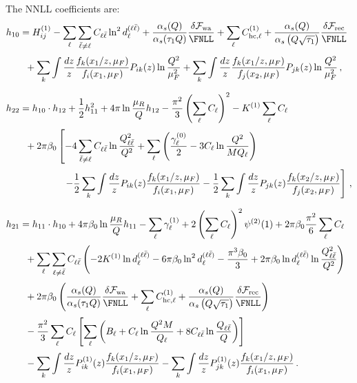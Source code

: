 The NNLL coefficients are:
\begin{subequations}
\begin{align}
&h_{10}= H_{ij}^{(1)}-\sum_{\ell}\sum_{\bar\ell\neq\ell} C_{\ell\bar\ell}\ln^2 d_\ell^{(\ell\bar\ell)}+\frac{\alpha_s(Q)}{\alpha_s(\tau_1 Q)}\frac{\delta\mathcal{F}_{\rm wa}}{\FNLL}+ \sum_{\ell}C_{\mathrm{hc},\ell}^{(1)}+\frac{\alpha_s(Q)}{\alpha_s\left(Q\sqrt{\tau_1}\right)}\frac{\delta\mathcal{F}_{\rm rec}}{\FNLL}\notag\\[0.5ex]
&\qquad +\sum_{k}\int\frac{dz}{z}\frac{f_k(x_1/z,\mu_F)}{f_i(x_1,\mu_F)} P_{ik}(z)\ln\frac{Q^2}{\mu_F^2}
+\sum_{k}\int\frac{dz}{z}\frac{f_k(x_1/z,\mu_F)}{f_j(x_2,\mu_F)} P_{jk}(z)\ln\frac{Q^2}{\mu_F^2}\,,\\[1.5ex]
\label{eq:h22}
&h_{22}=h_{10}\cdot h_{12}+\frac{1}{2}h_{11}^2+4\pi\ln\frac{\mu_R}{Q}h_{12}-\frac{\pi^2}{3}\left(\sum_{\ell}C_{\ell}\right)^2 -K^{(1)}\sum_{\ell}C_{\ell} \notag\\[0.5ex]
&\qquad+2\pi\beta_0\left[-4\sum_{\bar\ell\neq\ell}C_{\ell\bar\ell}\ln\frac{Q_{\ell\bar\ell}^2}{Q^2}
+\sum_{\ell}\left(\frac{\gamma_\ell^{(0)}}{2}-3C_\ell \ln\frac{Q^2}{M Q_{\ell}}\right)\right. \notag \\[0.5ex]
&\qquad\qquad\qquad\left. -\frac{1}{2}\sum_{k}\int\frac{dz}{z}P_{ik}(z)\frac{f_k(x_1/z,\mu_F)}{f_i(x_1,\mu_F)}-\frac{1}{2}\sum_{k}\int\frac{dz}{z}P_{jk}(z)\frac{f_k(x_2/z,\mu_F)}{f_j(x_2,\mu_F)}\right]\,,\\[1.5ex]
\label{eq:h21}
&h_{21}=h_{11}\cdot h_{10}+4\pi\beta_0\ln\frac{\mu_R}{Q}h_{11}-\sum_{\ell}\gamma_{\ell}^{(1)}+ 2\left(\sum_{\ell}C_{\ell}\right)^2\psi^{(2)}(1)+2\pi\beta_0\frac{\pi^2}{6}\sum_{\ell}C_{\ell} \notag\\[0.5ex]
&\qquad+\sum_{\ell}\sum_{\ell\neq \bar{\ell}} C_{\ell\bar{\ell}}\left(-2K^{(1)} \ln d_\ell^{(\ell\bar{\ell})}
  - 6\pi\beta_0 \ln^2 d_\ell^{(\ell\bar{\ell})} - \frac{\pi^3\beta_0}{3}+2 \pi\beta_0 \ln d_\ell^{(\ell\bar{\ell})}
 \ln\frac{Q_{\ell\bar{\ell}}^2}{Q^2}\right) \notag \\[0.5ex]
 &\qquad+2\pi\beta_0\left(\frac{\alpha_s(Q)}{\alpha_s(\tau_1 Q)}\frac{\delta\mathcal{F}_{\rm wa}}{\FNLL}+ \sum_{\ell}C_{\mathrm{hc},\ell}^{(1)}+\frac{\alpha_s(Q)}{\alpha_s\left(Q\sqrt{\tau_1}\right)}\frac{\delta\mathcal{F}_{\rm rec}}{\FNLL}\right)\notag\\[0.5ex]
&\qquad-\frac{\pi^2}{3} \sum_{\ell}C_{\ell}\left[\sum_{\ell}\left(B_{\ell}+C_{\ell}\ln\frac{Q^2 M}{Q_{\ell}}+ 8C_{\ell\bar\ell}\ln \frac{Q_{\ell\bar\ell}}{Q}\right) \right]\notag\\[0.5ex]
&\qquad-\sum_{k}\int\frac{dz}{z}P^{(1)}_{ik}(z)\frac{f_k(x_1/z,\mu_F)}{f_i(x_1,\mu_F)}-\sum_{k}\int\frac{dz}{z}P^{(1)}_{jk}(z)\frac{f_k(x_1/z,\mu_F)}{f_i(x_1,\mu_F)}\,.
\end{align}
\end{subequations}


